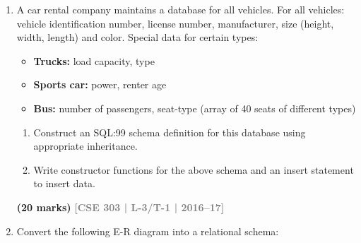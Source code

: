 \documentclass[12pt,a3paper]{article}
\newcommand{\yr}[1]{\hfill\textcolor{gray}{\small\textbf{[#1]}}}
\newcommand{\mk}[1]{\textcolor{orange!70!black}{\small\textbf{(#1 marks)}}}
\begin{document}
\begin{enumerate}
\item A car rental company maintains a database for all vehicles. For all vehicles: vehicle identification number, license number, manufacturer, size (height, width, length) and color. Special data for certain types:
\begin{itemize}[leftmargin=1.5em,itemsep=1pt]
  \item \textbf{Trucks:} load capacity, type
  \item \textbf{Sports car:} power, renter age
  \item \textbf{Bus:} number of passengers, seat-type (array of 40 seats of different types)
\end{itemize}
\begin{enumerate}
  \item Construct an SQL:99 schema definition for this database using appropriate inheritance.
  \item Write constructor functions for the above schema and an insert statement to insert data.
\end{enumerate}
\mk{20} \yr{CSE 303 | L-3/T-1 | 2016--17}

\item Convert the following E-R diagram into a relational schema:

\medskip
\begin{center}
\end{center}
\end{enumerate}
\end{document}
